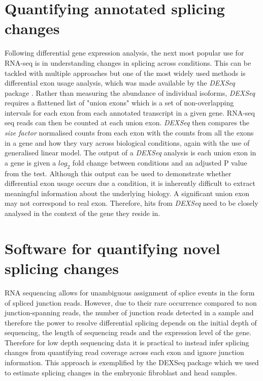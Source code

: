 
\section{Quantifying annotated splicing changes }
Following differential gene expression analysis, the next most popular use for RNA-seq is in understanding changes in splicing across conditions. This can be tackled with multiple approaches but one of the most widely used methods is differential exon usage analysis, which was made available by the \textit{DEXSeq} package \citep{Anders2012}. Rather than measuring the abundance of individual isoforms, \textit{DEXSeq} requires a flattened list of "union exons" which is a set of non-overlapping intervals for each exon from each annotated transcript in a given gene. RNA-seq seq reads can then be counted at each union exon. \textit{DEXSeq} then compares the \textit{size factor} normalised counts from each exon with the counts from all the exons in a gene and how they vary across biological conditions, again with the use of generalised linear model. 
The output of a \textit{DEXSeq} analysis is each union exon in a gene is given a $log_2$ fold change between conditions and an adjusted P value from the test. Although this output can be used to demonstrate whether differential exon usage occurs due a condition, it is inherently difficult to extract meaningful information about the underlying biology. A significant union exon may not correspond to real exon. Therefore, hits from \textit{DEXSeq} need to be closely analysed in the context of the gene they reside in. %

\section{Software for quantifying novel splicing changes}

RNA sequencing allows for unambiguous assignment of splice events in the form of spliced junction reads. 
However, due to their rare occurrence compared to non junction-spanning reads, the number of junction reads detected in a sample and therefore the power to resolve differential splicing depends on the initial depth of sequencing, the length of sequencing reads and the expression level of the gene. Therefore for low depth sequencing data it is practical to instead infer splicing changes from quantifying read coverage across each exon and ignore junction information. This approach is exemplified by the DEXSeq package \citep{Anders2012} which we used to estimate splicing changes in the embryonic fibroblast and head samples.

